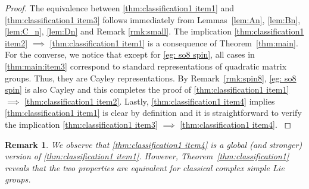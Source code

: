 \documentclass[11pt,reqno]{amsart}
\newtheorem{remark}[theorem]{Remark}
\begin{document}
\begin{proof}
The equivalence between \eqref{thm:classification1 item1} and \eqref{thm:classification1 item3} follows  immediately from Lemmas~\ref{lem:An},  \ref{lem:Bn},  \ref{lem:C_n},  \ref{lem:Dn} and Remark \ref{rmk:small}. The implication \eqref{thm:classification1 item2} $\implies$ \eqref{thm:classification1 item1} is a consequence of Theorem~\ref{thm:main}.  For the converse,  we notice that except for \eqref{eg: so8 spin},  all cases in \eqref{thm:main:item3} correspond to standard representations of quadratic matrix groups.  Thus,  they are Cayley representations.  By Remark~\ref{rmk:spin8},  \eqref{eg: so8 spin} is also Cayley and this completes the proof of \eqref{thm:classification1 item1} $\implies$ \eqref{thm:classification1 item2}.  {Lastly,  \eqref{thm:classification1 item4} implies \eqref{thm:classification1 item1} is clear by definition and it is straightforward to verify the implication  \eqref{thm:classification1 item3} $\implies$ \eqref{thm:classification1 item4}. }
\end{proof}
\begin{remark}
We observe that \eqref{thm:classification1 item4} is a global (and stronger) version of \eqref{thm:classification1 item1}.  However,  Theorem~\ref{thm:classification1} reveals that the two properties are equivalent for classical complex simple Lie groups.
\end{remark}
\end{document}
